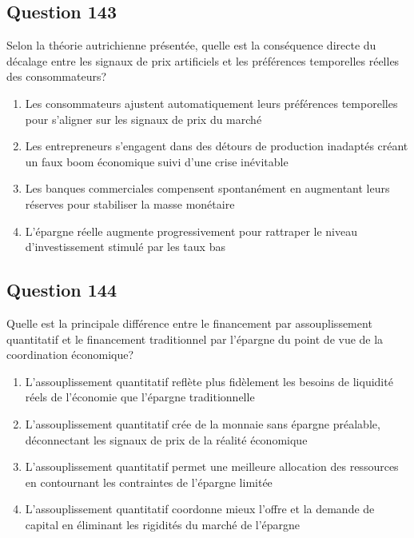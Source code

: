 \documentclass[12pt,a4paper]{article}
\begin{document}
\bigskip


\subsection*{Question 143}
Selon la théorie autrichienne présentée, quelle est la conséquence directe du décalage entre les signaux de prix artificiels et les préférences temporelles réelles des consommateurs?

\begin{enumerate}[label=\Alph*., leftmargin=*]
\item Les consommateurs ajustent automatiquement leurs préférences temporelles pour s'aligner sur les signaux de prix du marché
\item Les entrepreneurs s'engagent dans des détours de production inadaptés créant un faux boom économique suivi d'une crise inévitable
\item Les banques commerciales compensent spontanément en augmentant leurs réserves pour stabiliser la masse monétaire
\item L'épargne réelle augmente progressivement pour rattraper le niveau d'investissement stimulé par les taux bas
\end{enumerate}

\bigskip


\subsection*{Question 144}
Quelle est la principale différence entre le financement par assouplissement quantitatif et le financement traditionnel par l'épargne du point de vue de la coordination économique?

\begin{enumerate}[label=\Alph*., leftmargin=*]
\item L'assouplissement quantitatif reflète plus fidèlement les besoins de liquidité réels de l'économie que l'épargne traditionnelle
\item L'assouplissement quantitatif crée de la monnaie sans épargne préalable, déconnectant les signaux de prix de la réalité économique
\item L'assouplissement quantitatif permet une meilleure allocation des ressources en contournant les contraintes de l'épargne limitée
\item L'assouplissement quantitatif coordonne mieux l'offre et la demande de capital en éliminant les rigidités du marché de l'épargne
\end{enumerate}
\end{document}
